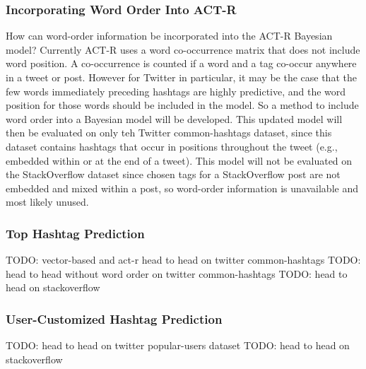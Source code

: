 \documentclass[man,floatsintext]{apa6}
\begin{document}
\subsubsection{Incorporating Word Order Into ACT-R}

How can word-order information be incorporated into the ACT-R Bayesian model?
Currently ACT-R uses a word co-occurrence matrix that does not include word position.
A co-occurrence is counted if a word and a tag co-occur anywhere in a tweet or post.
However for Twitter in particular, it may be the case that the few words immediately preceding hashtags are highly predictive, and the word position for those words should be included in the model.
So a method to include word order into a Bayesian model will be developed.
This updated model will then be evaluated on only teh Twitter common-hashtags dataset, since this dataset contains hashtags that occur in positions throughout the tweet (e.g., embedded within or at the end of a tweet).
This model will not be evaluated on the StackOverflow dataset since chosen tags for a StackOverflow post are not embedded and mixed within a post, so word-order information is unavailable and most likely unused.

\subsubsection{Top Hashtag Prediction}

TODO: vector-based and act-r head to head on twitter common-hashtags
TODO: head to head without word order on twitter common-hashtags
TODO: head to head on stackoverflow

\subsubsection{User-Customized Hashtag Prediction}

TODO: head to head on twitter popular-users dataset
TODO: head to head on stackoverflow

\begingroup
{}
\setlength\bibitemsep{12pt}
\printbibliography
\endgroup
\end{document}
